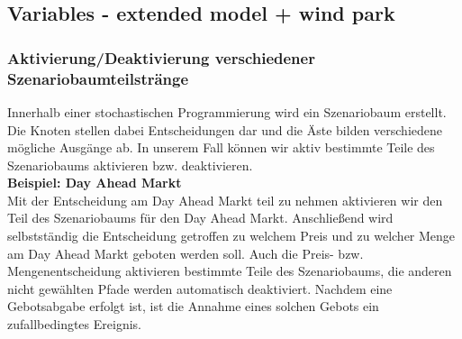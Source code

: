 \subsection{Variables - extended model + wind park}
\subsubsection{Aktivierung/Deaktivierung verschiedener Szenariobaumteilstränge}
 Innerhalb einer stochastischen Programmierung wird ein Szenariobaum erstellt. Die Knoten stellen dabei Entscheidungen dar und die Äste bilden verschiedene mögliche Ausgänge ab. In unserem Fall können wir aktiv bestimmte Teile des Szenariobaums aktivieren bzw. deaktivieren.\\

\textbf{Beispiel: Day Ahead Markt}\\
Mit der Entscheidung am Day Ahead Markt teil zu nehmen aktivieren wir den Teil des Szenariobaums für den Day Ahead Markt. Anschließend wird selbstständig die Entscheidung getroffen zu welchem Preis und zu welcher Menge am Day Ahead Markt geboten werden soll. Auch die Preis- bzw. Mengenentscheidung aktivieren bestimmte Teile des Szenariobaums, die anderen nicht gewählten Pfade werden automatisch deaktiviert. Nachdem eine Gebotsabgabe erfolgt ist, ist die Annahme eines solchen Gebots ein zufallbedingtes Ereignis.

